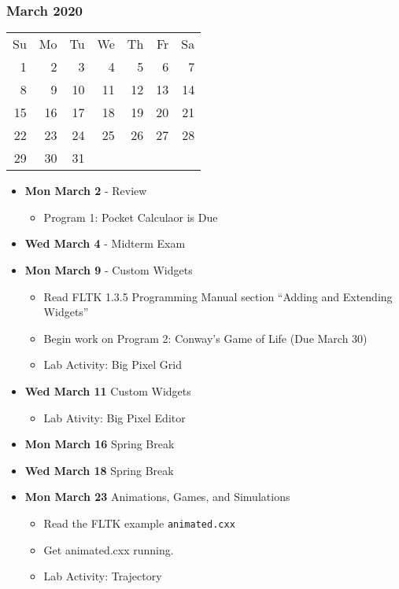 \subsubsection*{March 2020}
\begin{tabular}{rrrrrrr}
Su & Mo & Tu & We & Th & Fr & Sa\\
 1 &  2 &  3 &  4 &  5 &  6 &  7\\ 
 8 &  9 & 10 & 11 & 12 & 13 & 14\\ 
15 & 16 & 17 & 18 & 19 & 20 & 21\\ 
22 & 23 & 24 & 25 & 26 & 27 & 28\\
29 & 30 & 31 &    &    &    & \\
\end{tabular}
\begin{itemize}
\item\textbf{Mon March  2} - Review
    \begin{itemize}
        \item Program 1: Pocket Calculaor is Due
    \end{itemize}
\item\textbf{Wed March  4} - Midterm Exam
\item\textbf{Mon March  9} - Custom Widgets
    \begin{itemize}
        \item Read FLTK 1.3.5 Programming Manual section ``Adding and Extending Widgets''
        \item Begin work on Program 2: Conway's Game of Life (Due March 30)
        \item Lab Activity: Big Pixel Grid
    \end{itemize}
\item\textbf{Wed March 11} Custom Widgets
    \begin{itemize}
        \item Lab Ativity: Big Pixel Editor
    \end{itemize}
\item\textbf{Mon March 16} Spring Break
\item\textbf{Wed March 18} Spring Break
\item\textbf{Mon March 23} Animations, Games, and Simulations
    \begin{itemize}
        \item Read the FLTK example \texttt{animated.cxx} 
        \item Get animated.cxx running.
        \item Lab Activity: Trajectory
    \end{itemize}

\end{itemize}
